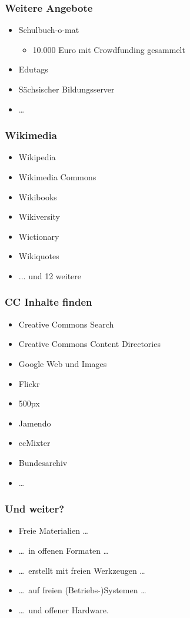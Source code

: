 \documentclass[table]{beamer}
\begin{document}
\begin{frame}
    \frametitle{Weitere Angebote}
    \begin{itemize}
        \item<2-> Schulbuch-o-mat
            \begin{itemize}
                \item<3-> 10.000 Euro mit Crowdfunding gesammelt
            \end{itemize}
        \item<4-> Edutags
        \item<5-> Sächsischer Bildungsserver
        \item<6-> \ldots
    \end{itemize}
\end{frame}

\begin{frame}
    \frametitle{Wikimedia}
    \begin{itemize}
      \item<2-> Wikipedia
      \item<3-> Wikimedia Commons
      \item<4-> Wikibooks
      \item<5-> Wikiversity
      \item<6-> Wictionary
      \item<7-> Wikiquotes
      \item<8-> ... und 12 weitere
    \end{itemize}
\end{frame}

\begin{frame}
    \frametitle{CC Inhalte finden}
    \begin{itemize}
        \item<2-> Creative Commons Search
        \item<3-> Creative Commons Content Directories
        \item<4-> Google Web und Images
        \item<5-> Flickr
        \item<6-> 500px
        \item<7-> Jamendo
        \item<8-> ccMixter
        \item<9-> Bundesarchiv
        \item<10-> \ldots
    \end{itemize}
\end{frame}

\begin{frame}
    \frametitle{Und weiter?}
    \begin{itemize}
      \item<2-> Freie Materialien \dots
      \item<3-> \dots~in offenen Formaten \dots
      \item<4-> \dots~erstellt mit freien Werkzeugen \dots
      \item<5-> \dots~auf freien (Betriebs-)Systemen \dots
      \item<6-> \dots~und offener Hardware.
    \end{itemize}
\end{frame}
\end{document}
